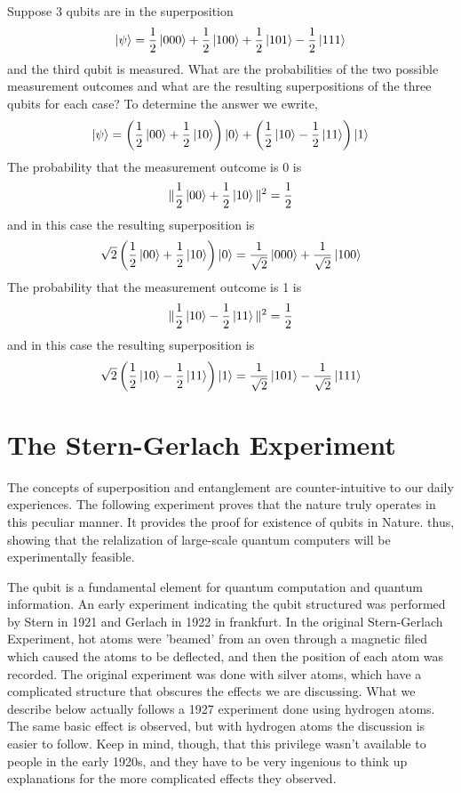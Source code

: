 \begin{example}
    Suppose 3 qubits are in the superposition
    \[\ket{\psi}=\frac{1}{2}\ket{000}+\frac{1}{2}\ket{100}+\frac{1}{2}\ket{101}-\frac{1}{2}\ket{111}\]
    and the third qubit is measured. What are the probabilities of the two possible measurement outcomes and what are the resulting superpositions of the three qubits for each case?
    To determine the answer we ewrite,
    \[
    \ket{\psi}=\left(\frac{1}{2}\ket{00}+\frac{1}{2}\ket{10}\right)\ket{0}+\left(\frac{1}{2}\ket{10}-\frac{1}{2}\ket{11}\right)\ket{1}
    \]
    The probability that the measurement outcome is 0 is
    \[
    \|\frac{1}{2}\ket{00}+\frac{1}{2}\ket{10}\|^2=\frac{1}{2}
    \]
    and in this case the resulting superposition is 
    \[
    \sqrt{2}\left(\frac{1}{2}\ket{00}+\frac{1}{2}\ket{10}\right)\ket{0}=\frac{1}{\sqrt{2}}\ket{000}+\frac{1}{\sqrt{2}}\ket{100}
    \]
    The probability that the measurement outcome is 1 is
    \[
    \|\frac{1}{2}\ket{10}-\frac{1}{2}\ket{11}\|^2=\frac{1}{2}
    \]
    and in this case the resulting superposition is
    \[
    \sqrt{2}\left(\frac{1}{2}\ket{10}-\frac{1}{2}\ket{11}\right)\ket{1}=\frac{1}{\sqrt{2}}\ket{101}-\frac{1}{\sqrt{2}}\ket{111}
    \]
\end{example}
\section{The Stern-Gerlach Experiment}
The concepts of superposition and entanglement are counter-intuitive to our daily experiences. The following experiment proves that the nature truly operates in this peculiar manner. It provides the proof for existence of qubits in Nature. thus, showing that the relalization of large-scale quantum computers will be experimentally feasible.

The qubit is a fundamental element for quantum computation and quantum information. An early experiment indicating the qubit structured was performed by Stern in 1921 and Gerlach in 1922 in frankfurt. In the original Stern-Gerlach Experiment, hot atoms were 'beamed' from an oven through a magnetic filed which caused the atoms to be deflected, and then the position of each atom was recorded. The original experiment was done with silver atoms, which have a complicated structure that obscures the effects we are discussing. What we describe below actually follows a 1927 experiment done using hydrogen atoms. The same basic effect is observed, but with hydrogen atoms the discussion is easier to follow. Keep in mind, though, that this privilege wasn't available to people in the early 1920s, and they have to be very ingenious to think up explanations for the more complicated effects they observed.

